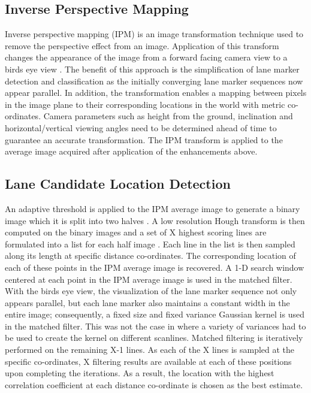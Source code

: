 \documentclass{article}
\begin{document}
\subsection{Inverse Perspective Mapping}
Inverse perspective mapping (IPM) is an image transformation technique used to remove the perspective effect from an image. Application of this transform changes the appearance of the image from a forward facing camera view to a birds eye view \cite{sehestedt_robust_2007,shu_vision_2004,bertozzi_gold:parallel_1998}. The benefit of this approach is the simplification of lane marker detection and classification as the initially converging lane marker sequences now appear parallel. In addition, the transformation enables a mapping between pixels in the image plane to their corresponding locations in the world with metric co-ordinates. Camera parameters such as height from the ground, inclination and horizontal/vertical viewing angles need to be determined ahead of time to guarantee an accurate transformation. The IPM transform is applied to the average image acquired after application of the enhancements above.

\subsection{Lane Candidate Location Detection}
An adaptive threshold is applied to the IPM average image to generate a binary image which it is split into two halves \cite{borkar_layered_2009}. A low resolution Hough transform is then computed on the binary images and a set of X highest scoring lines are formulated into a list for each half image \cite{borkar_layered_2009}. Each line in the list is then sampled along its length at specific distance co-ordinates. The corresponding location of each of these points in the IPM average image is recovered. A 1-D search window centered at each point in the IPM average image is used in the matched filter. With the birds eye view, the visualization of the lane marker sequence not only appears parallel, but each lane marker also maintains a constant width in the entire image; consequently, a fixed size and fixed variance Gaussian kernel is used in the matched filter. This was not the case in \cite{borkar_layered_2009} where a variety of variances had to be used to create the kernel on different scanlines. Matched filtering is iteratively performed on the remaining X-1 lines. As each of the X lines is sampled at the specific co-ordinates, X filtering results are available at each of these positions upon completing the iterations. As a result, the location with the highest correlation coefficient at each distance co-ordinate is chosen as the best estimate.
\end{document}

